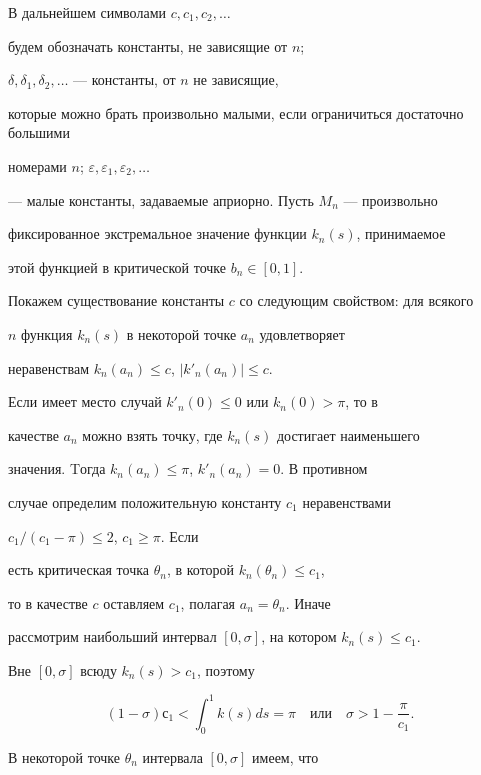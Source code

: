 \begin{pf}


В дальнейшем символами $c, c_1, c_2, \dotsc$


будем обозначать константы, не зависящие от $n$;


$\delta , \delta_1,\delta_2, \dotsc$ --- константы, от $n$ не зависящие,


которые можно брать произвольно малыми, если ограничиться достаточно большими


номерами $n$; $\varepsilon, \varepsilon_1, \varepsilon_2, \dotsc$


--- малые константы, задаваемые априорно. Пусть $M_n$ --- произвольно


фиксированное экстремальное значение функции $k_n (s)$, принимаемое


этой функцией в критической точке $b_n \in [0,1]$.





Покажем существование константы $c$ со следующим свойством: для всякого


$n$ функция $k_n (s)$ в некоторой точке $a_n$ удовлетворяет


неравенствам $k_n (a_n) \le c$, $| {{k}'_n(a_n)}| \le c$.


Если имеет место случай ${{k}'_n(0) \le 0}$ или $k_n(0) > \pi$, то в


качестве $a_n$ можно взять точку, где $k_n(s)$ достигает наименьшего


значения. Tогда ${k_n(a_n) \le \pi}$, ${{k}'_n(a_n)=0}$. В противном


случае определим положительную константу $c_1$ неравенствами


$c_1/(c_1-\pi) \le 2$, $c_1 \ge \pi$. Если


есть критическая точка $\theta_n$, в которой $k_n(\theta_n) \le c_1$,


то в качестве $c$ оставляем $c_1$, полагая ${a_n=\theta_n}$. Иначе


рассмотрим наибольший интервал $[0,\sigma ]$, на котором $k_n(s) \le c_1$.


Вне $[0,\sigma ]$ всюду $k_n(s) > c_1$, поэтому


$$


(1-\sigma) с_1 < \int_0^1 k (s)ds=\pi \quad \text{или} \quad


\sigma > 1-\frac{\pi}{c_1}.


$$


В некоторой точке $\theta_n$ интервала $[0,\sigma ]$ имеем, что



\end{pf}
